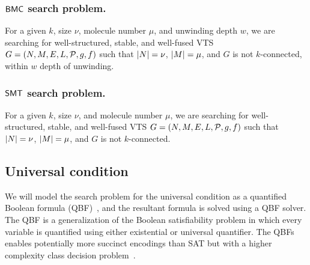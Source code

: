 \subsubsection{$\mathsf{BMC}$ search problem.}
For a given $k$, size $\nu$, molecule number $\mu$, and unwinding depth $w$,
we are searching for well-structured, stable, and well-fused VTS
$G = (N,M,E,L,\mathcal{P},g,f)$ such that
$|N| = \nu$, $|M| = \mu$, and $G$ is not $k$-connected, within $w$ depth of unwinding.    

\subsubsection{$\mathsf{SMT}$ search problem.}
For a given $k$, size $\nu$, and molecule number $\mu$,
we are searching for well-structured, stable, and well-fused VTS
$G = (N,M,E,L,\mathcal{P},g,f)$ such that
$|N| = \nu$, $|M| = \mu$, and
$G$ is not $k$-connected.    

%
%
%
%

\subsection{Universal condition}
\noindent We will model the search problem for the universal condition as a quantified Boolean formula (QBF)~\cite{buning2009theory, benedetti2008qbf}, and the resultant formula is solved using a QBF solver.
%
The QBF is a generalization of the Boolean satisfiability problem in which every variable is quantified using either existential or universal quantifier.
%
The QBFs enables potentially more succinct encodings than SAT but with a higher complexity class decision problem~\cite{buning2009theory}.
 
